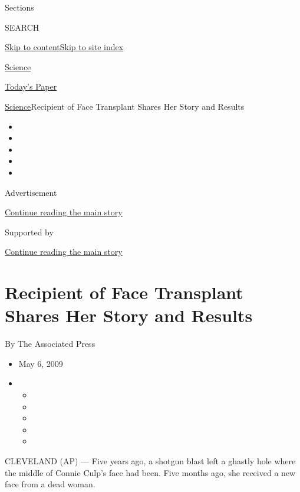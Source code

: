 Sections

SEARCH

\protect\hyperlink{site-content}{Skip to
content}\protect\hyperlink{site-index}{Skip to site index}

\href{https://www.nytimes.com/section/science}{Science}

\href{https://myaccount.nytimes.com/auth/login?response_type=cookie\&client_id=vi}{}

\href{https://www.nytimes.com/section/todayspaper}{Today's Paper}

\href{/section/science}{Science}\textbar{}Recipient of Face Transplant
Shares Her Story and Results

\begin{itemize}
\item
\item
\item
\item
\item
\end{itemize}

Advertisement

\protect\hyperlink{after-top}{Continue reading the main story}

Supported by

\protect\hyperlink{after-sponsor}{Continue reading the main story}

\hypertarget{recipient-of-face-transplant-shares-her-story-and-results}{%
\section{Recipient of Face Transplant Shares Her Story and
Results}\label{recipient-of-face-transplant-shares-her-story-and-results}}

By The Associated Press

\begin{itemize}
\item
  May 6, 2009
\item
  \begin{itemize}
  \item
  \item
  \item
  \item
  \item
  \end{itemize}
\end{itemize}

CLEVELAND (AP) --- Five years ago, a shotgun blast left a ghastly hole
where the middle of Connie Culp's face had been. Five months ago, she
received a new face from a dead woman.


